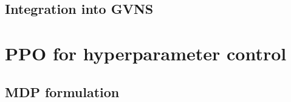\documentclass[preprint,12pt]{elsarticle}
\begin{document}


\subsection{Integration into GVNS}



\section{PPO for hyperparameter control}
\label{sec:ppo}

\subsection{MDP formulation}

\end{document}
